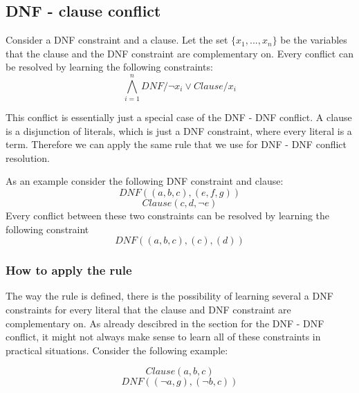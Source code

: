 \subsection{DNF - clause conflict}
\begin{leftbar}
Consider a DNF constraint and a clause. Let the set $\{x_1,...,x_n\}$ be the variables that the clause and the DNF constraint are complementary on. Every conflict can be resolved by learning the following constraints:
\begin{displaymath}
\bigwedge_{i=1}^{n} DNF / \neg x_i \vee Clause / x_i
\end{displaymath}
\end{leftbar}
This conflict is essentially just a special case of the DNF - DNF conflict. A clause is a disjunction of literals, which is just a DNF constraint, where every literal is a term. Therefore we can apply the same rule that we use for DNF - DNF conflict resolution.

As an example consider the following DNF constraint and clause:
\begin{displaymath}
DNF((a,b,c),(e,f,g))
\end{displaymath}
\begin{displaymath}
Clause(c,d,\neg e)
\end{displaymath}
Every conflict between these two constraints can be resolved by learning the following constraint
\begin{displaymath}
DNF((a,b,c),(c),(d))
\end{displaymath}

\subsubsection{How to apply the rule}

The way the rule is defined, there is the possibility of learning several a DNF constraints for every literal that the clause and DNF constraint are complementary on. As already descibred in the section for the DNF - DNF conflict, it might not always make sense to learn all of these constraints in practical situations. Consider the following example:
\begin{leftbar}
\begin{displaymath}
Clause(a,b,c)
\end{displaymath}
\begin{displaymath}
DNF((\neg a,g),(\neg b, c))
\end{displaymath}
\end{leftbar}

